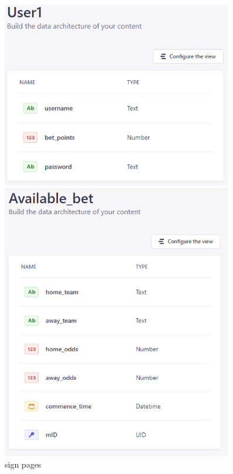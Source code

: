 \documentclass[singlecolumn]{article}
\begin{document}
\begin{figure}[H]
    \begin{minipage}[c]{0.3\textwidth}
    \centering
    \includegraphics[width=0.9\textwidth]{user1Schema.png}
    \end{minipage}%
    \begin{minipage}[c]{0.3\textwidth}
    \centering
    \includegraphics[width=0.9\textwidth]{available_betSchema.png}
    \end{minipage}
    \caption{sign pages}
\end{figure}
\end{document}
